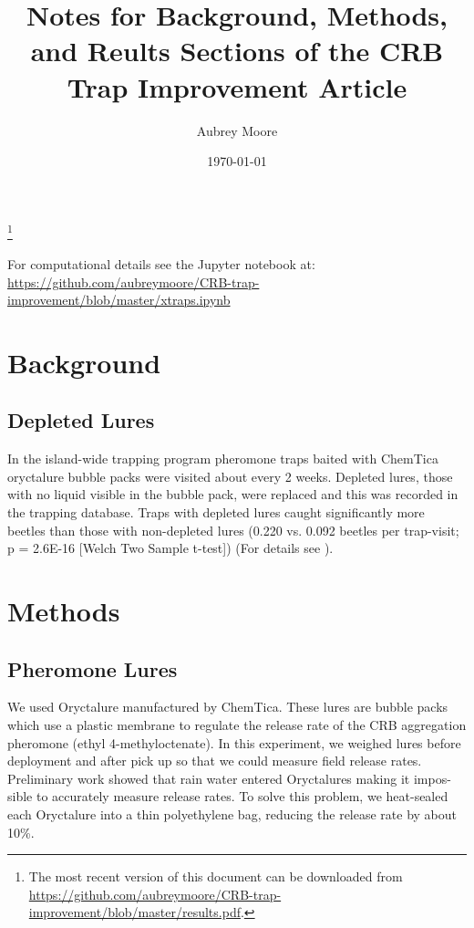 \documentclass[12pt,letterpaper,english,bibliography=totocnumbered, abstract=on]{scrartcl}
\begin{document}

\title{Notes for Background, Methods, and Reults Sections of the CRB Trap Improvement Article}

\author{Aubrey Moore}

\date{\today}


\maketitle

\tableofcontents

\footnote{The most recent version of this document can be downloaded from\\
\url{https://github.com/aubreymoore/CRB-trap-improvement/blob/master/results.pdf}.}

\pagebreak

For computational details see the Jupyter notebook at:\\
\url{https://github.com/aubreymoore/CRB-trap-improvement/blob/master/xtraps.ipynb}

\section{Background}

\subsection{Depleted Lures}

In the island-wide trapping program pheromone traps baited with ChemTica oryctalure bubble packs were visited about every 2 weeks. Depleted lures, those with no liquid visible in the bubble pack,  were replaced and this was recorded in the trapping database. Traps with depleted lures caught significantly more beetles than those with non-depleted lures (0.220 vs. 0.092 beetles per trap-visit; p = 2.6E-16 [Welch Two Sample t-test]) (For details see \cite{moore_research_2012}).

\section{Methods}

\subsection{Pheromone Lures}

We used Oryctalure manufactured by ChemTica. These lures are bubble packs which use a plastic
membrane to regulate the release rate of the CRB aggregation pheromone (ethyl 4-methyloctenate).
In this experiment, we weighed lures before deployment and after pick up so that we could measure
field release rates. Preliminary work showed that rain water entered Oryctalures making it impos-
sible to accurately measure release rates. To solve this problem, we heat-sealed each Oryctalure
into a thin polyethylene bag, reducing the release rate by about 10\%. 
\end{document}
